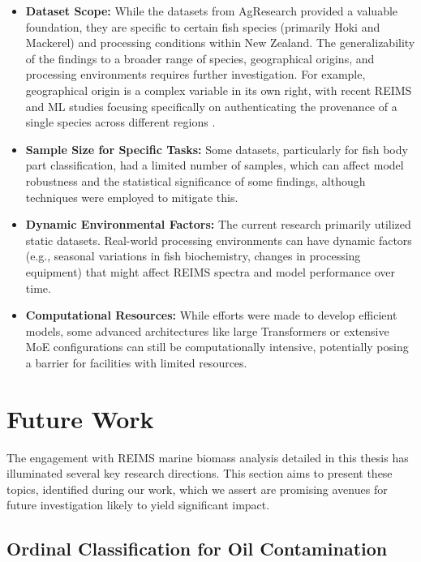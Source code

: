 \begin{itemize}
\item \textbf{Dataset Scope:} While the datasets from AgResearch provided a valuable foundation, they are specific to certain fish species (primarily Hoki and Mackerel) and processing conditions within New Zealand. The generalizability of the findings to a broader range of species, geographical origins, and processing environments requires further investigation. For example, geographical origin is a complex variable in its own right, with recent REIMS and ML studies focusing specifically on authenticating the provenance of a single species across different regions \citep{Lu2024}.
\item \textbf{Sample Size for Specific Tasks:} Some datasets, particularly for fish body part classification, had a limited number of samples, which can affect model robustness and the statistical significance of some findings, although techniques were employed to mitigate this.
\item \textbf{Dynamic Environmental Factors:} The current research primarily utilized static datasets. Real-world processing environments can have dynamic factors (e.g., seasonal variations \citep{OpenSeas2021} in fish biochemistry, changes in processing equipment) that might affect REIMS spectra and model performance over time.
\item \textbf{Computational Resources:} While efforts were made to develop efficient models, some advanced architectures like large Transformers or extensive MoE configurations can still be computationally intensive, potentially posing a barrier for facilities with limited resources.
\end{itemize}

\section{Future Work}

The engagement with REIMS marine biomass analysis detailed in this thesis has illuminated several key research directions. This section aims to present these topics, identified during our work, which we assert are promising avenues for future investigation likely to yield significant impact.

\subsection{Ordinal Classification for Oil Contamination}

